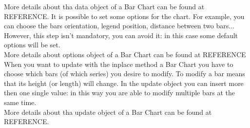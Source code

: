 			More details about tha data object of a Bar Chart can be found at REFERENCE.
			It is possible to set some options for the chart. For example, you can choose the bars orientation, legend position, distance between two bars... However, this step isn't mandatory, you can avoid it: in this case some default options will be set.\\
			More details about options object of a Bar Chart can be found at REFERENCE
			When you want to update with the inplace method a Bar Chart you have to choose which bars (of which series) you desire to modify. To modify a bar means that its height (or length) will change. In the update object you can insert more then one single value: in this way you are able to modify multiple bars at the same time.\\
			More details about tha update object of a Bar Chart can be found at REFERENCE.